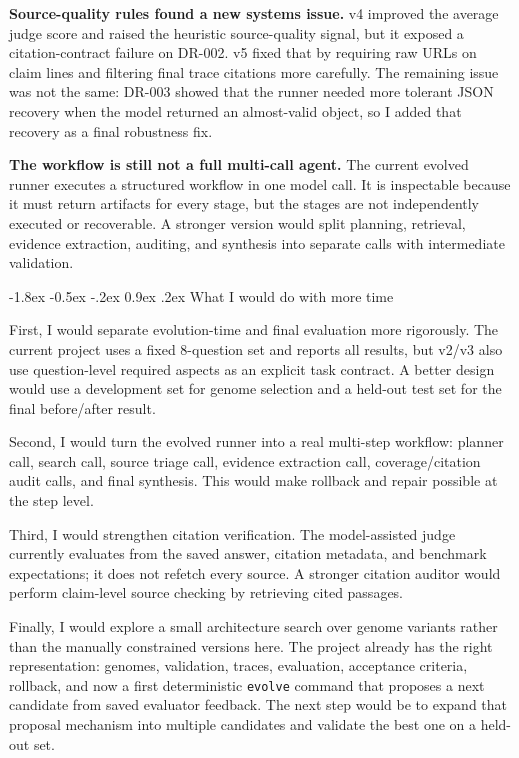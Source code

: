 \documentclass[10pt]{article}
\makeatletter
\renewcommand\section{\@startsection{section}{1}{\z@}%
  {-1.8ex \@plus -0.5ex \@minus -.2ex}%
  {0.9ex \@plus .2ex}%
  {\normalfont\large\bfseries}}
\makeatother
\begin{document}
\textbf{Source-quality rules found a new systems issue.} v4 improved the average judge score and raised the heuristic source-quality signal, but it exposed a citation-contract failure on DR-002. v5 fixed that by requiring raw URLs on claim lines and filtering final trace citations more carefully. The remaining issue was not the same: DR-003 showed that the runner needed more tolerant JSON recovery when the model returned an almost-valid object, so I added that recovery as a final robustness fix.

\textbf{The workflow is still not a full multi-call agent.} The current evolved runner executes a structured workflow in one model call. It is inspectable because it must return artifacts for every stage, but the stages are not independently executed or recoverable. A stronger version would split planning, retrieval, evidence extraction, auditing, and synthesis into separate calls with intermediate validation.

\section{What I would do with more time}

First, I would separate evolution-time and final evaluation more rigorously. The current project uses a fixed 8-question set and reports all results, but v2/v3 also use question-level required aspects as an explicit task contract. A better design would use a development set for genome selection and a held-out test set for the final before/after result.

Second, I would turn the evolved runner into a real multi-step workflow: planner call, search call, source triage call, evidence extraction call, coverage/citation audit calls, and final synthesis. This would make rollback and repair possible at the step level.

Third, I would strengthen citation verification. The model-assisted judge currently evaluates from the saved answer, citation metadata, and benchmark expectations; it does not refetch every source. A stronger citation auditor would perform claim-level source checking by retrieving cited passages.

Finally, I would explore a small architecture search over genome variants rather than the manually constrained versions here. The project already has the right representation: genomes, validation, traces, evaluation, acceptance criteria, rollback, and now a first deterministic \texttt{evolve} command that proposes a next candidate from saved evaluator feedback. The next step would be to expand that proposal mechanism into multiple candidates and validate the best one on a held-out set.
\end{document}
